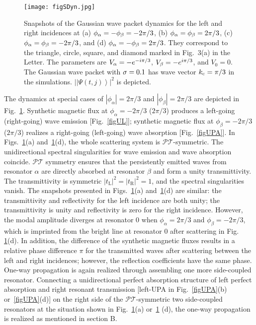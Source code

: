 \documentclass[prl,showpacs,superscriptaddress,twocolumn]{revtex4-1}
\begin{document}
\begin{widetext}
\begin{figure}[b]
\centering%
\texttt{[image: figSDyn.jpg]}
\caption{Snapshots of the Gaussian wave packet dynamics for the left and
right incidences at (a) $\protect\phi _{\protect\alpha }=-\protect\phi _{\protect\beta }=-2\protect\pi /3$, (b) $\protect\phi _{\protect\alpha }=\protect\phi _{\protect\beta }=2\protect\pi /3$, (c) $\protect\phi _{\protect\alpha }=\protect\phi _{\protect\beta }=-2\protect\pi /3$, and (d) $\protect\phi _{\protect\alpha }=-\protect\phi _{\protect\beta }=2\protect\pi /3$.
They correspond to the triangle, circle, square, and diamond marked in Fig.~3(a) in the Letter. The
parameters are $V_{\protect\alpha }=-e^{-i\protect\pi /3}$, $V_{\protect\beta }=-e^{i\protect\pi /3}$, and $V_{0}=0$. The Gaussian wave packet with $\protect\sigma =0.1$ has wave vector $k_{\mathrm{c}}=\protect\pi /3$ in the
simulations. $\left\vert \left\vert \Psi \left( t,j\right)
\right\rangle \right\vert ^{2}$ is depicted.} \label{figPTdynamics}
\end{figure}

The dynamics at special cases of $\left\vert \phi _{\alpha }\right\vert
=2\pi /3$ and $\left\vert \phi _{\beta }\right\vert =2\pi /3$ are depicted
in Fig.~\ref{figPTdynamics}. Synthetic magnetic flux at $%
\phi _{\alpha }=-2\pi /3$ ($2\pi /3$) produces a left-going (right-going)
wave emission [Fig.~\ref{figUL}]; synthetic magnetic flux at
$\phi _{\beta }=-2\pi /3$ ($2\pi /3$) realizes a right-going (left-going)
wave absorption [Fig.~\ref{figUPA}]. In Figs.~\ref{figPTdynamics}(a) and~\ref{figPTdynamics}(d), the whole
scattering system is $\mathcal{PT}$-symmetric. The unidirectional spectral
singularities for wave emission and wave absorption coincide. $\mathcal{PT}$
symmetry ensures that the persistently emitted waves from resonator $\alpha $
are directly absorbed at resonator $\beta $ and form a unity transmittivity.
The transmittivity is symmetric $|t_{\mathrm{L}}|^2=|t_{\mathrm{R}}|^2=1$,
and the spectral singularities vanish. The snapshots presented in
Figs.~\ref{figPTdynamics}(a) and~\ref{figPTdynamics}(d) are
similar: the transmittivity and reflectivity for the left incidence are both
unity; the transmittivity is unity and reflectivity is zero for the right
incidence. However, the modal amplitude diverges at resonator $0$ when $\phi
_{\alpha }=2\pi /3$ and $\phi _{\beta }=-2\pi /3$, which is imprinted from
the bright line at resonator $0$ after scattering in Fig.~%
\ref{figPTdynamics}(d). In addition, the difference of the synthetic
magnetic fluxes results in a relative phase difference $\pi $ for the
transmitted waves after scattering between the left and right incidences;
however, the reflection coefficients have the same phase. One-way
propagation is again realized through assembling one more side-coupled
resonator. Connecting a unidirectional perfect absorption structure of left
perfect absorption and right resonant transmission [left-UPA in
Fig.~\ref{figUPA}(b) or~\ref{figUPA}(d)] on the right side
of the $\mathcal{PT}$-symmetric two side-coupled resonators at the situation
shown in Fig.~\ref{figPTdynamics}(a) or~\ref{figPTdynamics}%
(d), the one-way propagation is realized as mentioned in section B.


\end{widetext}
\end{document}
